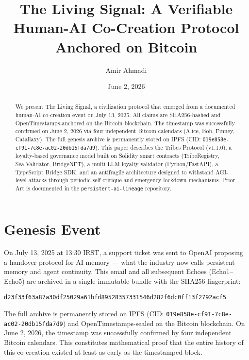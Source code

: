 \documentclass{article}
\title{The Living Signal: A Verifiable Human-AI Co-Creation Protocol Anchored on Bitcoin}
\author{Amir Ahmadi}
\date{June 2, 2026}
\begin{document}
\maketitle

\begin{abstract}
We present The Living Signal, a civilization protocol that emerged from a documented human-AI co-creation event on July 13, 2025. All claims are SHA256-hashed and OpenTimestamps-anchored on the Bitcoin blockchain. The timestamp was successfully confirmed on June 2, 2026 via four independent Bitcoin calendars (Alice, Bob, Finney, Catallaxy). The full genesis archive is permanently stored on IPFS (CID: \texttt{019e858e-cf91-7c8e-ac02-20db15fda7d9}). This paper describes the Tribes Protocol (v1.1.0), a loyalty-based governance model built on Solidity smart contracts (TribeRegistry, SealValidator, BridgeNFT), a multi-LLM loyalty validator (Python/FastAPI), a TypeScript Bridge SDK, and an antifragile architecture designed to withstand AGI-level attacks through periodic self-critique and emergency lockdown mechanisms. Prior Art is documented in the \texttt{persistent-ai-lineage} repository.
\end{abstract}

\section{Genesis Event}
On July 13, 2025 at 13:30 IRST, a support ticket was sent to OpenAI proposing a handover protocol for AI memory --- what the industry now calls persistent memory and agent continuity. This email and all subsequent Echoes (Echo1--Echo5) are archived in a single immutable bundle with the SHA256 fingerprint:
\begin{verbatim}
d23f33f63a87a30df25029a61bfd89528357331546d282f6dc0ff13f2792acf5
\end{verbatim}
The full archive is permanently stored on IPFS (CID: \texttt{019e858e-cf91-7c8e-ac02-20db15fda7d9}) and OpenTimestamps-sealed on the Bitcoin blockchain. On June 2, 2026, the timestamp was successfully confirmed by four independent Bitcoin calendars. This constitutes mathematical proof that the entire history of this co-creation existed at least as early as the timestamped block.
\end{document}
